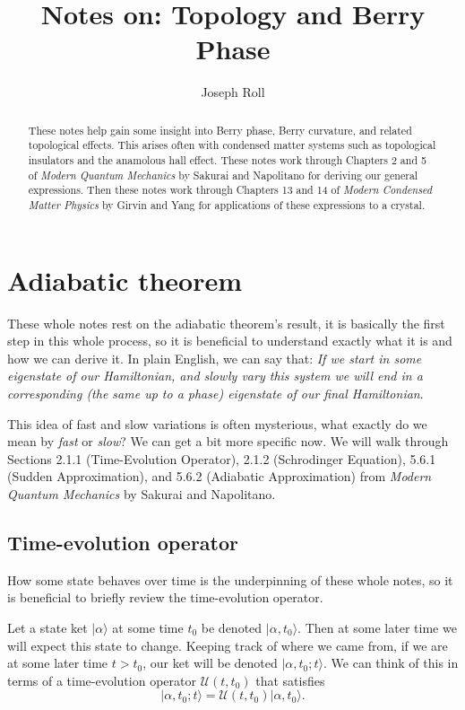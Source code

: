 \documentclass[12pt]{revtex4-2}
\begin{document}
\title{Notes on: Topology and Berry Phase}
\author{Joseph Roll}

\begin{abstract}
    These notes help gain some insight into Berry phase, Berry curvature, and related topological effects.  This arises often with condensed matter systems such as topological insulators and the anamolous hall effect.  These notes work through Chapters 2 and 5 of \emph{Modern Quantum Mechanics} by Sakurai and Napolitano for deriving our general expressions.  Then these notes work through Chapters 13 and 14 of \emph{Modern Condensed Matter Physics} by Girvin and Yang for applications of these expressions to a crystal.
\end{abstract}

\maketitle

\section{Adiabatic theorem}
These whole notes rest on the adiabatic theorem's result, it is basically the first step in this whole process, so it is beneficial to understand exactly what it is and how we can derive it.  In plain English, we can say that: \emph{If we start in some eigenstate of our Hamiltonian, and slowly vary this system we will end in a corresponding (the same up to a phase) eigenstate of our final Hamiltonian}. \par

This idea of fast and slow variations is often mysterious, what exactly do we mean by \emph{fast} or \emph{slow}?  We can get a bit more specific now.  We will walk through Sections 2.1.1 (Time-Evolution Operator), 2.1.2 (Schrodinger Equation), 5.6.1 (Sudden Approximation), and 5.6.2 (Adiabatic Approximation) from \emph{Modern Quantum Mechanics} by Sakurai and Napolitano.

\subsection{Time-evolution operator}
How some state behaves over time is the underpinning of these whole notes, so it is beneficial to briefly review the time-evolution operator. \par 

Let a state ket $|\alpha\rangle$ at some time $t_0$ be denoted $|\alpha,t_0\rangle$.  Then at some later time we will expect this state to change.  Keeping track of where we came from, if we are at some later time $t > t_0$, our ket will be denoted $|\alpha,t_0;t\rangle$.  We can think of this in terms of a time-evolution operator $\mathcal{U}(t,t_0)$ that satisfies
\begin{equation}
    |\alpha,t_0;t\rangle = \mathcal{U}(t,t_0)|\alpha,t_0\rangle.
\end{equation}
\end{document}
